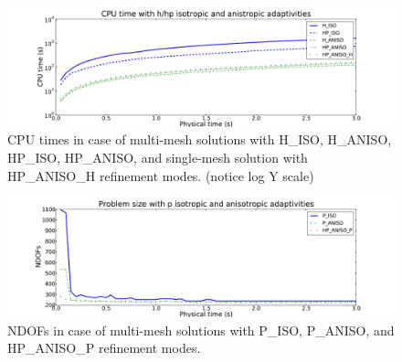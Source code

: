 \begin{figure}[!ht]
  \begin{centering}
  \includegraphics[width=\columnwidth]{isoaniso_cpu}
  \caption{\label{fig:isoanisocpu} CPU times in case 
  of multi-mesh solutions with H\_ISO, H\_ANISO,
  HP\_ISO, HP\_ANISO, and single-mesh solution with HP\_ANISO\_H
  refinement modes. (notice log Y scale)}
  \end{centering}
\end{figure}

\begin{figure}[!ht]
  \begin{centering}
  \includegraphics[width=\columnwidth]{isoanisop_dof}
  \caption{\label{fig:isoanisopdof} NDOFs in case 
  of multi-mesh solutions with P\_ISO, P\_ANISO, and
  HP\_ANISO\_P refinement modes.}
  \end{centering}
\end{figure}

